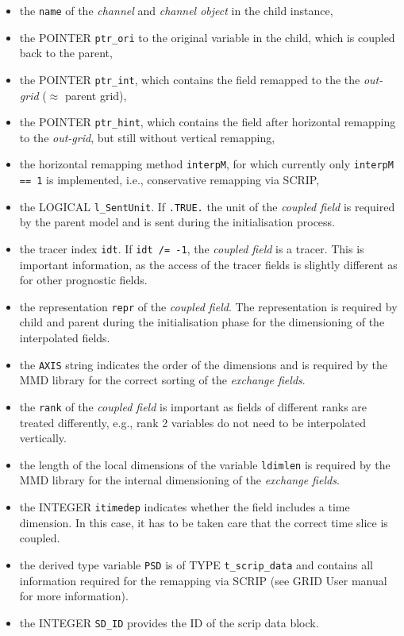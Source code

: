 \documentclass[11pt,twoside]{article}
\begin{document}
\begin{itemize}%
\item the \verb|name| of the {\it channel} and {\it channel object} in the
 child instance,
\item the {\footnotesize POINTER} \verb|ptr_ori| to the original variable in the child,
which is coupled back to the parent,
\item the {\footnotesize POINTER} \verb|ptr_int|, which contains the field remapped to the
the {\it out-grid} ($\approx$ parent grid),
\item the {\footnotesize POINTER} \verb|ptr_hint|, which contains the field after horizontal
remapping to the {\it out-grid}, but still without vertical remapping,
\item the horizontal remapping method \verb|interpM|, for which currently only
 \verb|interpM == 1| is implemented, i.e., conservative remapping via SCRIP,
\item the {\footnotesize LOGICAL }\verb|l_SentUnit|. If \verb|.TRUE.| the unit of the {\it
coupled field} is required by the parent model and is sent during the
initialisation process.
\item the tracer index \verb|idt|. If \verb|idt /= -1|, the {\it coupled
field} is a 
tracer. This is important information, as the access of the tracer fields is
slightly different as for other prognostic fields.
\item the representation \verb|repr| of the {\it coupled field}. The representation
is required by child and parent during the initialisation phase for the
dimensioning of the interpolated fields.
\item the \verb|AXIS| string indicates the order of the dimensions and is
required by the MMD library for the correct sorting of the {\it exchange
fields}. 
\item the \verb|rank| of the {\it coupled field} is important as fields of different
ranks are treated differently, e.g., rank 2 variables do not need to be
interpolated vertically.
\item the length of the local dimensions of the variable \verb|ldimlen| is
required by the MMD library for the internal dimensioning of the 
{\it exchange fields}.
\item the {\footnotesize INTEGER} \verb|itimedep| indicates whether the field includes a time
dimension. In this case, it has to be taken care that the  correct time slice 
is coupled.
\item the derived type variable \verb|PSD| is of TYPE \verb|t_scrip_data| and
contains all information required for the remapping via SCRIP (see GRID User
manual for more information).
\item the {\footnotesize INTEGER} \verb|SD_ID| provides the ID of the scrip data block.
\end{itemize}%
\end{document}
